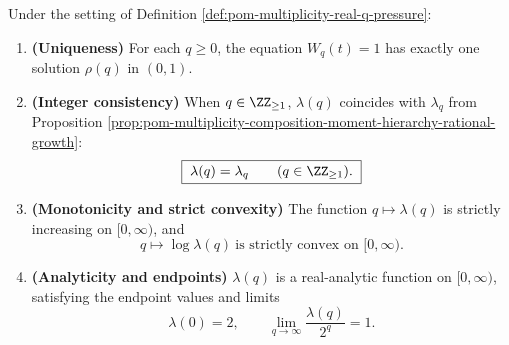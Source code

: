 \begin{theorem}\label{thm:pom-multiplicity-real-q-pressure}
Under the setting of Definition \ref{def:pom-multiplicity-real-q-pressure}:
\begin{enumerate}
  \item \textbf{(Uniqueness)} For each \(q\ge 0\), the equation \(W_q(t)=1\) has exactly one solution \(\rho(q)\) in \((0,1)\).
  \item \textbf{(Integer consistency)} When \(q\in\ZZ_{\ge 1}\), \(\lambda(q)\) coincides with \(\lambda_q\) from Proposition \ref{prop:pom-multiplicity-composition-moment-hierarchy-rational-growth}:
  \[
  \boxed{\;\lambda(q)=\lambda_q\qquad(q\in\ZZ_{\ge 1}).\;}
  \]
  \item \textbf{(Monotonicity and strict convexity)} The function \(q\mapsto \lambda(q)\) is strictly increasing on \([0,\infty)\), and
  \[
  \boxed{\;q\mapsto \log \lambda(q)\ \text{is strictly convex on }[0,\infty).\;}
  \]
  \item \textbf{(Analyticity and endpoints)} \(\lambda(q)\) is a real-analytic function on \([0,\infty)\), satisfying the endpoint values and limits
  \[
  \boxed{\;\lambda(0)=2,\qquad \lim_{q\to\infty}\frac{\lambda(q)}{2^{q}}=1.\;}
  \]
\end{enumerate}
\end{theorem}
